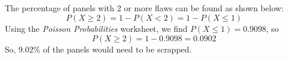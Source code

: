 \documentclass[letterpaper]{article}
\begin{document}
\subsection{}%
The percentage of panels with 2 or more flaws can be found as shown below:
$$P(X\geq2)=1-P(X<2) = 1-P(X\leq1)$$
Using the \textit{Poisson Probabilities} worksheet,
we find $P(X\leq1)=0.9098$, so
$$P(X\geq2) = 1-0.9098 = 0.0902 $$
So, $9.02\%$ of the panels would need to be scrapped.


\subsection{}%

\section{}%

\subsection{}%

\subsection{}%

\section{}%

\subsection{}%
\end{document}
